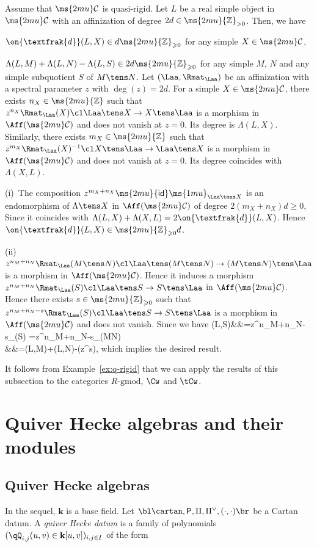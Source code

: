 \documentclass[12pt,leqno]{amsart}%
\renewcommand{\ge}{\geqslant}
\theoremstyle{plain}
\theoremstyle{definition}
\newcommand{\Z}{\ms{2mu}{\mathbb Z}}
\newcommand{\gmod}{\text{-}\mathrm{gmod}}
\newcommand{\de}{\on{\textfrak{d}}}
\newcommand{\cmA}{\cartan}  %
\newcommand{\wlP}{\mathsf{P}}   %
\newcommand{\bR}{\mathbf{k}} 		%
\newcommand{\La}{\Lambda} 			%
\newcommand{\id}{\ms{2mu}{\mathsf{id}}\ms{1mu}}   				%
\newcommand{\bnum}{\be[{\rm(i)}]}
\newcommand{\shc}{{\ms{2mu}\mathcal{C}}}
\numberwithin{equation}{section}
\begin{document}
\Prop\label{prop:ddd}
Assume that $\shc$ is quasi-rigid.
Let $L$ be a real simple object in $\shc$ with an affinization of degree
$2d\in \Z_{>0}$.
Then, we have
\bnum
\item
$\de(L,X)\in d\Z_{\ge0}$ for any simple $X\in\shc$,
\item
$\La(L,M)+\La(L,N)-\La(L,S)\in 2d\Z_{\ge0}$
for any simple $M$, $N$ and any simple subquotient $S$ of $M\tens N$.
\ee
\enprop
\Proof
Let $(\Laa,\Rmat_\Laa)$ be an affinization with a spectral parameter $z$ with $\deg(z)=2d$.
For a simple $X\in\shc$, there exists $n_X\in\Z$ such that
$z^{n_X}\Rmat_\Laa(X)\cl \Laa\tens X\to X\tens\Laa$ is a morphism in $\Aff(\shc)$
and does not vanish at $z=0$. Its degree is $\La(L,X)$.
Similarly, there exists $m_X\in\Z$ such that
$z^{m_X}\Rmat_\Laa(X)^{-1}\cl X\tens\Laa\to\Laa\tens X$  is a morphism in $\Aff(\shc)$
and does not vanish at $z=0$. Its degree coincides with $\La(X,L)$.

\snoi(i)\ 
The composition
$z^{m_X+n_X}\id_{\Laa\tens X}$ is an endomorphism of $\La\tens X$ in $\Aff(\shc)$
of degree $2(m_X+n_X)d\ge0$,
Since it coincides with $\La(L,X)+\La(X,L)=2\de(L,X)$.
Hence $\de(L,X)\in\Z_{\ge0}d$.

\snoi
(ii)\
$z^{n_M+n_N}\Rmat_\Laa(M\tens N)\cl \Laa\tens (M\tens N)\to
(M\tens N)\tens \Laa$ is a morphism in $\Aff(\shc)$.
Hence it induces a morphism
$z^{n_M+n_N}\Rmat_\Laa(S)\cl \Laa\tens S\to
S\tens \Laa$ in $\Aff(\shc)$.
Hence there exists $s\in\Z_{\ge0}$ such that
$z^{n_M+n_N-s}\Rmat_\Laa(S)\cl \Laa\tens S\to
S\tens \Laa$ is a morphism in $\Aff(\shc)$ and does not vanish.
Since we have
\eqn
\La(L,S)&&=\deg\bl z^{n_M+n_N-s}\Rmat_\Laa(S)\br
=\deg\bl z^{n_M+n_N-s}\Rmat_\Laa(M\tens N)\br\\
&&=\La(L,M)+\La(L,N)-\deg(z^s),\eneqn
which implies the desired result.
\QED

 \Rem
It follows from Example~\ref{ex:q-rigid}
that we can apply the results of this subsection
to the categories $R\gmod$, $\Cw$ and $\tCw$.
\enrem
%
\section{Quiver Hecke algebras and their modules}
\subsection{Quiver Hecke algebras } In the sequel, $\bR$ is a base field.
Let $ \bl\cmA,\wlP,\Pi,\Pi^\vee,(\cdot,\cdot) \br $ be a Cartan datum.
A { \em quiver Hecke datum} is a family of polynomials
$(\qQ_{i,j}(u,v) \in \bR[u,v])_{i,j\in I}$ of the form
\end{document}
